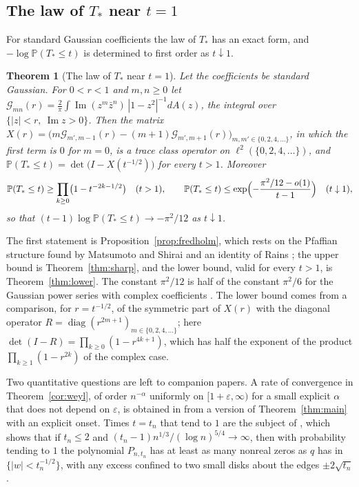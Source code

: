 \documentclass[11pt]{amsart}
\newtheorem{theorem}{Theorem}[section]
\theoremstyle{definition}
\theoremstyle{remark}
\numberwithin{equation}{section}
\newcommand{\PP}{\mathbb{P}}
\newcommand{\eps}{\varepsilon}
\DeclareMathOperator{\im}{Im}
\begin{document}
\subsection{The law of \texorpdfstring{$T_*$}{T*} near \texorpdfstring{$t=1$}{t=1}}\label{sec:intro-quant}
For standard Gaussian coefficients the law of $T_*$ has an exact form, and $-\log\PP(T_*\le t)$ is determined to first order as $t\downarrow1$.

\begin{theorem}[The law of $T_*$ near $t=1$]\label{thm:sharp-intro}
Let the coefficients be standard Gaussian. For $0<r<1$ and $m,n\ge0$ let $\mathcal G_{mn}(r)=\frac2\pi\int\im(z^m\bar z^n)\,|1-z^2|^{-1}dA(z)$, the integral over $\{|z|<r,\ \im z>0\}$. Then the matrix $X(r)=\bigl(m\mathcal G_{m',m-1}(r)-(m+1)\mathcal G_{m',m+1}(r)\bigr)_{m,m'\in\{0,2,4,\dots\}}$, in which the first term is $0$ for $m=0$, is a trace class operator on $\ell^2(\{0,2,4,\dots\})$, and $\PP(T_*\le t)=\det\bigl(I-X(t^{-1/2})\bigr)$ for every $t>1$. Moreover
\[
\PP(T_*\le t)\ge\prod_{k\ge0}\bigl(1-t^{-2k-1/2}\bigr)\quad(t>1),\qquad
\PP(T_*\le t)\le\exp\Bigl(-\frac{\pi^2/12-o(1)}{t-1}\Bigr)\quad(t\downarrow1),
\]
so that $(t-1)\log\PP(T_*\le t)\to-\pi^2/12$ as $t\downarrow1$.
\end{theorem}

The first statement is Proposition~\ref{prop:fredholm}, which rests on the Pfaffian structure found by Matsumoto and Shirai \cite{MS} and an identity of Rains \cite{Ra}; the upper bound is Theorem~\ref{thm:sharp}, and the lower bound, valid for every $t>1$, is Theorem~\ref{thm:lower}. The constant $\pi^2/12$ is half of the constant $\pi^2/6$ for the Gaussian power series with complex coefficients \cite{PV}. The lower bound comes from a comparison, for $r=t^{-1/2}$, of the symmetric part of $X(r)$ with the diagonal operator $R=\operatorname{diag}(r^{2m+1})_{m\in\{0,2,4,\dots\}}$; here $\det(I-R)=\prod_{k\ge0}(1-r^{4k+1})$, which has half the exponent of the product $\prod_{k\ge1}(1-r^{2k})$ of the complex case.

Two quantitative questions are left to companion papers. A rate of convergence in Theorem~\ref{cor:weyl}, of order $n^{-\alpha}$ uniformly on $[1+\eps,\infty)$ for a small explicit $\alpha$ that does not depend on $\eps$, is obtained in \cite{CompA} from a version of Theorem~\ref{thm:main} with an explicit onset. Times $t=t_n$ that tend to $1$ are the subject of \cite{CompB}, which shows that if $t_n\le2$ and $(t_n-1)n^{1/3}/(\log n)^{5/4}\to\infty$, then with probability tending to $1$ the polynomial $P_{n,t_n}$ has at least as many nonreal zeros as $q$ has in $\{|w|<t_n^{-1/2}\}$, with any excess confined to two small disks about the edges $\pm2\sqrt{t_n}$.
\end{document}
